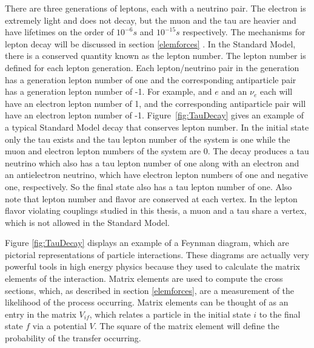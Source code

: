 \documentclass[oneside, letterpaper, oldfontcommands]{memoir}
\begin{document}

\qquad There are three generations of leptons, each with a neutrino pair. The electron is extremely light and does not decay, but the muon and the tau are heavier and have lifetimes on the order of $10^{-6}s$ and $10^{-15}s$ respectively\cite{Agashe:2014kda}. The mechanisms for lepton decay will be discussed in section \ref{elemforces} . In the Standard Model, there is a conserved quantity known as the lepton number. The lepton number is defined for each lepton generation. Each lepton/neutrino pair in the generation has a generation lepton number of one and the corresponding antiparticle pair has a generation lepton number of -1. For example, and $e$ and an $\nu_{e}$ each will have an electron lepton number of 1, and the corresponding antiparticle pair will have an electron lepton number of -1. Figure~\ref{fig:TauDecay} gives an example of a typical Standard Model decay that conserves lepton number. In the initial state only the tau exists and the tau lepton number of the system is one while the muon and electron lepton numbers of the system are 0. The decay produces a tau neutrino which also has a tau lepton number of one along with an electron and an antielectron neutrino, which have electron lepton numbers of one and negative one, respectively. So the final state also has a tau lepton number of one. Also note that lepton number and flavor are conserved at each vertex. In the lepton flavor violating couplings studied in this thesis, a muon and a tau share a vertex, which is not allowed in the Standard Model. 

Figure \ref{fig:TauDecay} displays an example of a Feynman diagram, which are pictorial representations of particle interactions. These diagrams are actually very powerful tools in high energy physics because they used to calculate the matrix elements of the interaction. Matrix elements are used to compute the cross sections, which, as described in section \ref{elemforces}, are a measurement of the likelihood of the process occurring. Matrix elements can be thought of as an entry in the matrix $V_{if}$, which relates a particle in the initial state $i$ to the final state $f$ via a potential $V$. The square of the matrix element will define the probability of the transfer occurring.
\end{document}
